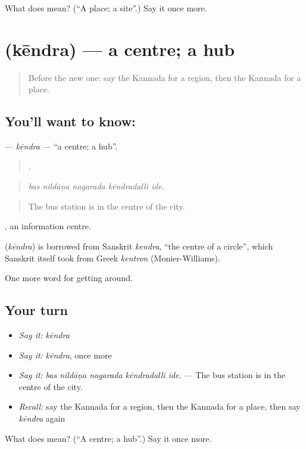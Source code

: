 \begin{tcolorbox}[breakable,colback=teal!4,colframe=teal!35!black,title={Before you move on}]
What does  mean? (\textquotedblleft{}A place; a site\textquotedblright{}.) Say it once more.
\end{tcolorbox}
\section[\texorpdfstring{\kn{ಕೇಂದ್ರ} (kēndra)}{ಕೇಂದ್ರ (kēndra)}]{ (kēndra) — a centre; a hub}

\label{lesson:KA-C465-kendra}



\begin{quote}
Before the new one: say the Kannada for a region, then the Kannada for a place.
\end{quote}

\subsection*{You'll want to know: }
\textbf{} — \emph{kēndra} — \textquotedblleft{}a centre; a hub\textquotedblright{}.

\begin{quote}
    .
\end{quote}

\begin{quote}
\emph{bas nildāṇa nagarada kēndradalli ide.}
\end{quote}

\begin{quote}
The bus station is in the centre of the city.
\end{quote}

 , an information centre.

\begin{cousinweb}
\textbf{} (\emph{kēndra}) is borrowed from Sanskrit \emph{kendra}, \textquotedblleft{}the centre of a circle\textquotedblright{}, which Sanskrit itself took from Greek \emph{kentron} (Monier-Williams).
\end{cousinweb}

\begin{grammarlens}[title={What you've built}]
One more word for getting around.
\end{grammarlens}

\subsection*{Your turn}
\begin{itemize}
\raggedright
  \item \emph{Say it:} \emph{kēndra}
  \item \emph{Say it:} \emph{kēndra}, once more
  \item \emph{Say it:} \emph{bas nildāṇa nagarada kēndradalli ide.} — The bus station is in the centre of the city.
  \item \emph{Recall:} say the Kannada for a region, then the Kannada for a place, then say \emph{kēndra} again
\end{itemize}

\begin{tcolorbox}[breakable,colback=teal!4,colframe=teal!35!black,title={Before you move on}]
What does  mean? (\textquotedblleft{}A centre; a hub\textquotedblright{}.) Say it once more.
\end{tcolorbox}
